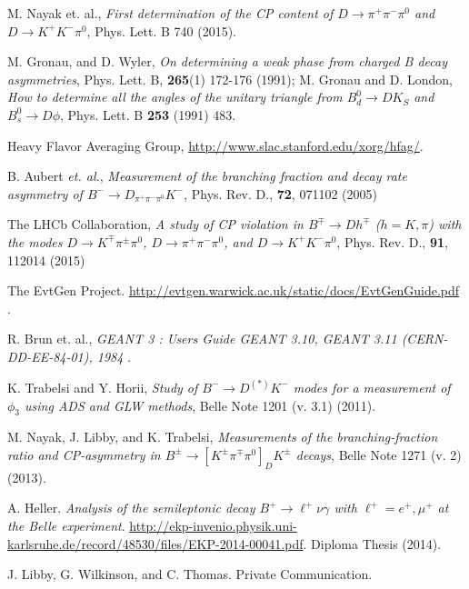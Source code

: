 \documentclass[aps,prl,twocolumn,superscriptaddress,showpacs,preprintnumbers,amsmath,amssymb]{revtex4}
\begin{document}
\begin{thebibliography}{99}


M. Nayak et. al., \emph{First determination of the CP content of $D \rightarrow \pi^+ \pi^- \pi^0$ and $D \rightarrow K^+ K^- \pi^0$}, Phys. Lett. B 740 (2015).

M. Gronau, and D. Wyler, \emph{On determining a weak phase from charged B decay asymmetries}, Phys. Lett. B, \textbf{265}(1) 172-176 (1991); M. Gronau and D. London, \emph{How to determine all the angles of the unitary triangle from $B^0_d \rightarrow DK_S$ and $B^0_s \rightarrow D\phi$}, Phys. Lett. B \textbf{253} (1991) 483. 

 Heavy Flavor Averaging Group, \url{http://www.slac.stanford.edu/xorg/hfag/}.


B. Aubert \textit{et. al.}, \emph{Measurement of the branching fraction and decay rate asymmetry of $B^- \rightarrow D_{\pi^+ \pi^- \pi^0}K^-$}, Phys. Rev. D., \textbf{72}, 071102 (2005)

The LHCb Collaboration, \emph{A study of CP violation in $B^{\mp} \rightarrow Dh^{\mp}$ ($h = K, \pi$) with the modes $D \rightarrow K^{\mp} \pi^{\pm} \pi^0$, $D \rightarrow \pi^{+} \pi^{-} \pi^0$, and $D \rightarrow K^{+} K^{-} \pi^0$}, Phys. Rev. D., \textbf{91}, 112014 (2015)

The EvtGen Project. \url{http://evtgen.warwick.ac.uk/static/docs/EvtGenGuide.pdf} .

R. Brun et. al., \emph{GEANT 3 : Users Guide GEANT 3.10, GEANT 3.11 (CERN-DD-EE-84-01), 1984} .

K. Trabelsi and Y. Horii, \emph{Study of $B^- \rightarrow D^{(*)}K^-$ modes for a measurement of $\phi_3$ using ADS and GLW methods}, Belle Note 1201 (v. 3.1) (2011).

M. Nayak, J. Libby, and K. Trabelsi, \emph{Measurements of the branching-fraction ratio and CP-asymmetry in $B^{\pm} \rightarrow [K^{\pm} \pi^{\mp}\pi^0]_DK^{\pm}$ decays}, Belle Note 1271 (v. 2) (2013).

A. Heller. \emph{Analysis of the semileptonic decay $B^+ \rightarrow \ell^+ \nu \gamma$ with $\ell^+ = e^+, \mu^+$ at the Belle experiment}. \url{http://ekp-invenio.physik.uni-karlsruhe.de/record/48530/files/EKP-2014-00041.pdf}. Diploma Thesis (2014).

J. Libby, G. Wilkinson, and C. Thomas. Private Communication.


\end{thebibliography}
\end{document}
